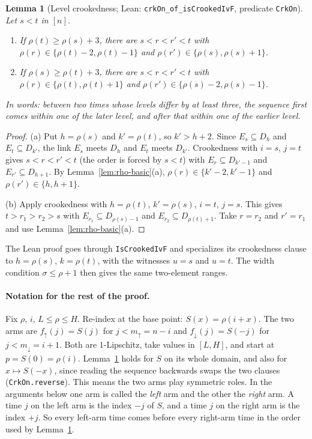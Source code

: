 \documentclass[11pt]{article}
\newtheorem{lemma}[theorem]{Lemma}
\theoremstyle{definition}
\theoremstyle{remark}
\newcommand{\lean}[1]{\texttt{#1}}
\begin{document}
\begin{lemma}[Level crookedness; Lean: \lean{crkOn\_of\_isCrookedIvF},
predicate \lean{CrkOn}]\label{lem:crkon}
Let $s<t$ in $[n]$.
\begin{enumerate}[label=(\alph*)]
\item If $\rho(t)\ge\rho(s)+3$, there are $s<r<r'<t$ with
$\rho(r)\in\{\rho(t)-2,\rho(t)-1\}$ and $\rho(r')\in\{\rho(s),\rho(s)+1\}$.
\item If $\rho(s)\ge\rho(t)+3$, there are $s<r<r'<t$ with
$\rho(r)\in\{\rho(t),\rho(t)+1\}$ and $\rho(r')\in\{\rho(s)-2,\rho(s)-1\}$.
\end{enumerate}
In words: between two times whose levels differ by at least three, the sequence
first comes within one of the \emph{later} level, and after that within one of
the \emph{earlier} level.
\end{lemma}
\begin{proof}
(a) Put $h=\rho(s)$ and $k'=\rho(t)$, so $k'>h+2$. Since $E_s\subseteq D_h$ and
$E_t\subseteq D_{k'}$, the link $E_s$ meets $D_h$ and $E_t$ meets $D_{k'}$.
Crookedness with $i=s$, $j=t$ gives $s<r<r'<t$ (the order is forced by $s<t$)
with $E_r\subseteq D_{k'-1}$ and $E_{r'}\subseteq D_{h+1}$. By
Lemma~\ref{lem:rho-basic}(a), $\rho(r)\in\{k'-2,k'-1\}$ and
$\rho(r')\in\{h,h+1\}$.

(b) Apply crookedness with $h=\rho(t)$, $k'=\rho(s)$, $i=t$, $j=s$. This gives
$t>r_1>r_2>s$ with $E_{r_1}\subseteq D_{\rho(s)-1}$ and
$E_{r_2}\subseteq D_{\rho(t)+1}$. Take $r=r_2$ and $r'=r_1$ and use
Lemma~\ref{lem:rho-basic}(a).
\end{proof}

The Lean proof goes through \lean{IsCrookedIvF} and specializes its
crookedness clause to $h=\rho(s)$, $k=\rho(t)$, with the witnesses $u=s$ and
$u=t$. The width condition $\sigma\le\rho+1$ then gives the same two-element
ranges.

\paragraph{Notation for the rest of the proof.}
Fix $\rho$, $i$, $L\le\rho\le H$. Re-index at the base point: $S(x)=\rho(i+x)$.
The two arms are $f_{\uparrow}(j)=S(j)$ for $j<m_\uparrow=n-i$ and
$f_{\downarrow}(j)=S(-j)$ for $j<m_\downarrow=i+1$. Both are $1$-Lipschitz,
take values in $[L,H]$, and start at $p=S(0)=\rho(i)$. Lemma~\ref{lem:crkon}
holds for $S$ on its whole domain, and also for $x\mapsto S(-x)$, since reading
the sequence backwards swaps the two clauses (\lean{CrkOn.reverse}). This means
the two arms play symmetric roles. In the arguments below one arm is called
the \emph{left} arm and the other the \emph{right} arm. A time $j$ on the left
arm is the index $-j$ of $S$, and a time $j$ on the right arm is the index $+j$.
So every left-arm time comes before every right-arm time in the order used by
Lemma~\ref{lem:crkon}.
\end{document}

